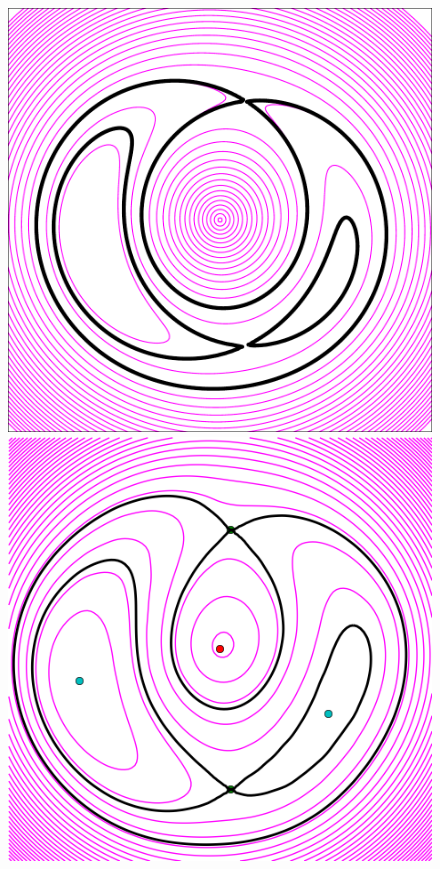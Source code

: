 \begin{figure}
  \includegraphics[width=\myplotswidth]{fig/ASW0000h2m_007022_arriv}
  \includegraphics[width=\myplotswidth]{fig/007022_spaghetti} \\

\end{figure}
